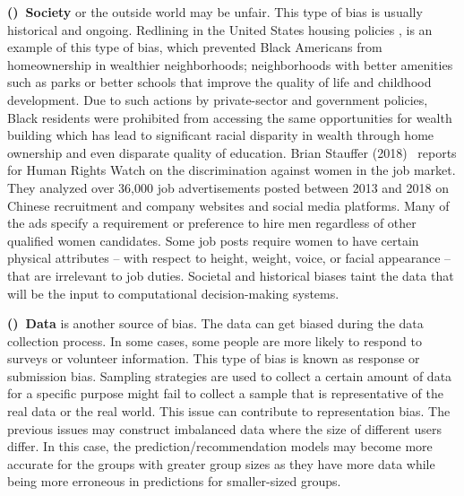         
        \textbf{()~Society} or the outside world may be unfair. This type of bias is usually historical and ongoing. Redlining in the United States housing policies \cite{rothstein2017color}, is an example of this type of bias, which prevented Black Americans from homeownership in wealthier neighborhoods; neighborhoods with better amenities such as parks or better schools that improve the quality of life and childhood development. Due to such actions by private-sector and government policies, Black residents were prohibited from accessing the same opportunities for wealth building which has lead to significant racial disparity in wealth through home ownership and even disparate quality of education.
        Brian Stauffer (2018)~\cite{HRW2018ads} reports for Human Rights Watch on the discrimination against women in the job market. They analyzed over 36,000 job advertisements posted between 2013 and 2018 on Chinese recruitment and company websites and social media platforms. Many of the ads specify a requirement or preference to hire men regardless of other qualified women candidates. Some job posts require women to have certain physical attributes – with respect to height, weight, voice, or facial appearance – that are irrelevant to job duties. Societal and historical biases taint the data that will be the input to computational decision-making systems.

        
        \textbf{()~Data} is another source of bias. The data can get biased during the data collection process. In some cases, some people are more likely to respond to surveys or volunteer information. This type of bias is known as response or submission bias. Sampling strategies are used to collect a certain amount of data for a specific purpose might fail to collect a sample that is representative of the real data or the real world. This issue can contribute to representation bias. The previous issues may construct imbalanced data where the size of different users differ. In this case, the prediction/recommendation models may become more accurate for the groups with greater group sizes as they have more data while being more erroneous in predictions for smaller-sized groups.
        
